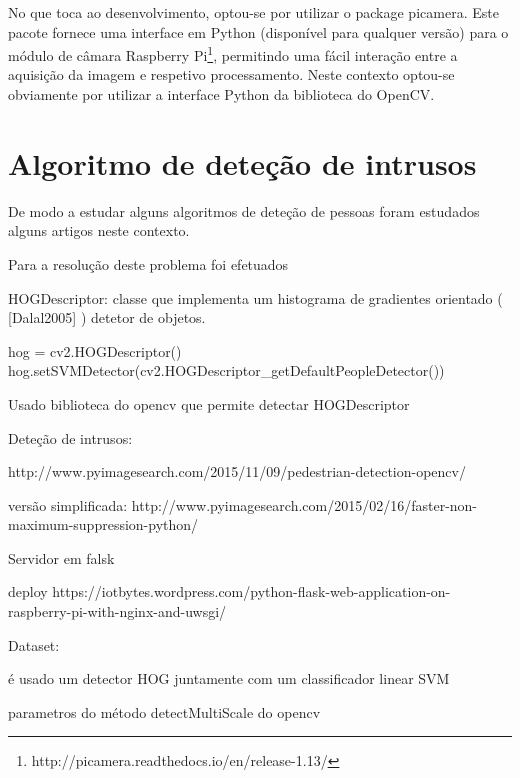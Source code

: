 No que toca ao desenvolvimento, optou-se por utilizar o package picamera. Este pacote fornece  uma interface em Python (disponível para qualquer versão) para o módulo de câmara Raspberry Pi\footnote{http://picamera.readthedocs.io/en/release-1.13/}, permitindo uma fácil interação entre a aquisição da imagem e respetivo processamento. Neste contexto optou-se obviamente por utilizar a interface Python da biblioteca do OpenCV.



\section{Algoritmo de deteção de intrusos}

De modo a estudar alguns algoritmos de deteção de pessoas foram estudados alguns artigos neste contexto. 


Para a resolução deste problema foi efetuados 


HOGDescriptor: classe que implementa um histograma de gradientes orientado ( [Dalal2005] ) detetor de objetos. 

hog = cv2.HOGDescriptor()
hog.setSVMDetector(cv2.HOGDescriptor\_getDefaultPeopleDetector())




Usado biblioteca do opencv que permite detectar 
HOGDescriptor


Deteção de intrusos: 

http://www.pyimagesearch.com/2015/11/09/pedestrian-detection-opencv/



versão simplificada: http://www.pyimagesearch.com/2015/02/16/faster-non-maximum-suppression-python/



Servidor em falsk 


deploy 
	https://iotbytes.wordpress.com/python-flask-web-application-on-raspberry-pi-with-nginx-and-uwsgi/



Dataset: %


é usado um detector HOG juntamente com um classificador linear SVM 





parametros do método detectMultiScale do opencv 

